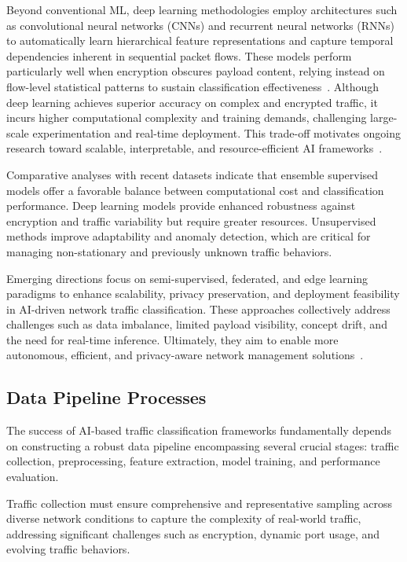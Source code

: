 \documentclass[sigconf]{acmart}
\begin{document}
Beyond conventional ML, deep learning methodologies employ architectures such as convolutional neural networks (CNNs) and recurrent neural networks (RNNs) to automatically learn hierarchical feature representations and capture temporal dependencies inherent in sequential packet flows. These models perform particularly well when encryption obscures payload content, relying instead on flow-level statistical patterns to sustain classification effectiveness~\cite{ref1,ref6,ref51}. Although deep learning achieves superior accuracy on complex and encrypted traffic, it incurs higher computational complexity and training demands, challenging large-scale experimentation and real-time deployment. This trade-off motivates ongoing research toward scalable, interpretable, and resource-efficient AI frameworks~\cite{ref51}.

Comparative analyses with recent datasets indicate that ensemble supervised models offer a favorable balance between computational cost and classification performance. Deep learning models provide enhanced robustness against encryption and traffic variability but require greater resources. Unsupervised methods improve adaptability and anomaly detection, which are critical for managing non-stationary and previously unknown traffic behaviors.

Emerging directions focus on semi-supervised, federated, and edge learning paradigms to enhance scalability, privacy preservation, and deployment feasibility in AI-driven network traffic classification. These approaches collectively address challenges such as data imbalance, limited payload visibility, concept drift, and the need for real-time inference. Ultimately, they aim to enable more autonomous, efficient, and privacy-aware network management solutions~\cite{ref51}.

\subsection{Data Pipeline Processes}

The success of AI-based traffic classification frameworks fundamentally depends on constructing a robust data pipeline encompassing several crucial stages: traffic collection, preprocessing, feature extraction, model training, and performance evaluation.

Traffic collection must ensure comprehensive and representative sampling across diverse network conditions to capture the complexity of real-world traffic, addressing significant challenges such as encryption, dynamic port usage, and evolving traffic behaviors.
\end{document}
